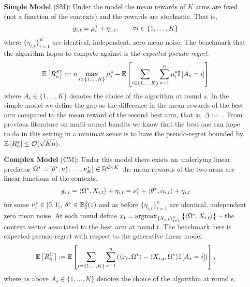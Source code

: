 \textbf{Simple Model} (SM): Under the model the mean rewards of $K$ arms are fixed (not a function of the contexts) and the rewards are stochastic. That is,
\begin{align*}
    g_{i,t} = \mu_{i}^{*} + \eta_{1,t},\qquad  \forall i \in \{1,\ldots, K\}
    \end{align*}
where $\{\eta_{i,t}\}_{i=1}^K$ are identical, independent, zero mean noise. The benchmark that the algorithm hopes to compete against is the \emph{expected pseudo-regret},
\begin{align}
    \label{def:expectedpseudoregret}
    \mathbb{E}\left[R^{S}_n \right] := n \max_{i \in \{1,\ldots, K\}} \mu_{i}^{*} -\mathbb{E}\left[ \sum_{i \in \{1,\ldots, K\}}\sum_{s = 1}^n \mu_{i}^{*} \mathbb{I}\left[A_s = i\right]  \right]
\end{align}
where $A_s \in \{1,\ldots,K\}$ denotes the choice of the algorithm at round $s$. In the simple model we define the gap as the difference in the mean rewards of the best arm compared to the mean reward of the second best arm, that is, $\Delta :=  $ . From previous literature on multi-armed bandits \citep{auer2002finite} we know that the best one can hope to do in this setting in a minimax sense is to have the pseudo-regret bounded by $\mathbb{E}\left[R^s_{n}\right] \le \mathcal{O}(\sqrt{K n})$.


\textbf{Complex Model} (CM): Under this model there exists an underlying linear predictor $\Omega^* = [\theta^{*},  \nu_{1}^{*},\ldots,\nu_{K}^{*} ] \in \mathbb{R}^{d\times K}$ the mean rewards of the two arms are linear functions of the contexts,
\begin{align*}
    g_{i,t} = \langle \Omega^*, X_{i,t} \rangle + \eta_{i,t} = \nu_{i}^{*} + \langle \theta^{*}, \alpha_{i,t}\rangle + \eta_{i,t}
\end{align*}
for some $\nu_{i}^{*} \in [0,1]$, $\theta^{*} \in \mathbb{B}_2^d(1)$ and as before $\{\eta_{i,t}\}_{t=1}^n$ are identical, independent zero mean noise. At each round define $x_t = \argmax_{\{\Xit{i}{t}\}_{i=1}^K}\left\{ \langle \Omega^*, X_{i,t}\rangle \right\}$ -- the context vector associated to the best arm at round $t$. The benchmark here is expected pseudo regret with respect to the generative linear model:
\begin{align}
\label{def:expectedregret}
    \mathbb{E}\left[R^{C}_{n}\right] := \mathbb{E}\left[\sum_{i = \{1,\ldots,K\}}\sum_{s=1}^n \left(\langle x_t, \Omega^* \rangle - \langle X_{i,s},\Omega^*\rangle \mathbb{I}\left[A_s = i \right] \right) \right],
\end{align}
where as above $A_s \in \{1,\ldots,K\}$ denotes the choice of the algorithm at round s. 

